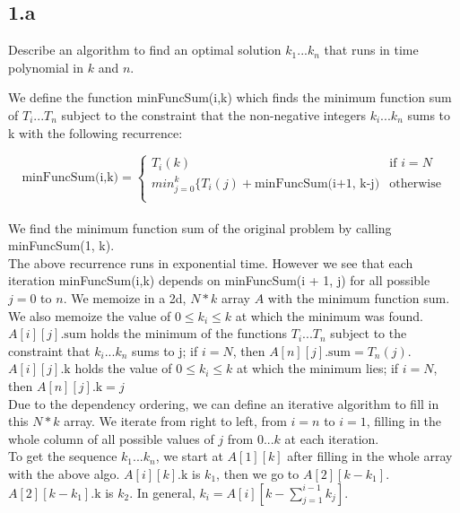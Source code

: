 \documentclass[11pt]{article}
\begin{document}




\subsection *{1.a} Describe an algorithm to find an optimal solution $k_1...k_n$ that runs in time polynomial in $k$ and $n$. 
\begin{solution}
We define the function minFuncSum(i,k) which finds the minimum function sum of $T_i... T_n$ subject to the constraint that the non-negative integers $k_i...k_n$ sums to k with the following recurrence: 

\[
	\text{minFuncSum(i,k)} = \begin{cases}
		T_i(k) & \text{if $i = N$} \\
		min_{j=0}^{k} \{T_i(j) + \text{minFuncSum(i+1, k-j)} & \text{otherwise} \\
	\end{cases}
\]
\\ 
We find the minimum function sum of the original problem by calling minFuncSum(1, k). \\

The above recurrence runs in exponential time. However we see that each iteration minFuncSum(i,k) depends on minFuncSum(i + 1, j) for all possible $j = 0 $ to $n$. We memoize in a 2d, $N*k$ array $A$ with the minimum function sum. We also memoize the value of $0 \leq k_i \leq k$ at which the minimum was found. \\ 

$A[i][j].\text{sum}$ holds the minimum of the functions $T_i...T_n$ subject to the constraint that $k_i...k_n$ sums to j; if $i = N$, then $A[n][j].\text{sum} = T_n(j)$. $A[i][j].\text{k}$ holds the value of $0 \leq k_i \leq k$ at which the minimum lies; if $i = N$, then $A[n][j].\text{k}=j$ \\

Due to the dependency ordering, we can define an iterative algorithm to fill in this $N*k$ array. We iterate from right to left, from $i=n$ to $i=1$, filling in the whole column of all possible values of $j$ from $0...k$ at each iteration. \\ 

To get the sequence $k_1...k_n$, we start at $A[1][k]$ after filling in the whole array with the above algo. $A[i][k].\text{k}$ is $k_1$, then we go to $A[2][k-k_1]$. $A[2][k-k_1].\text{k}$ is $k_2$. In general, $k_i= A[i][k-\sum_{j=1}^{i-1} k_j]$. \\ 


\end{solution}
\end{document}
